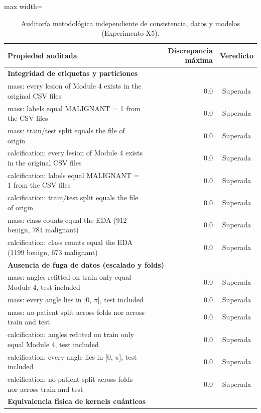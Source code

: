 \begin{table}[H]
\centering
\small
\caption{Auditoría metodológica independiente de consistencia, datos y modelos (Experimento X5).}
\label{tab:anexo_x5_auditoria}
\begin{adjustbox}{max width=\linewidth}
\begin{tabular}{p{11.5cm} r c}
\toprule
Propiedad auditada & Discrepancia máxima & Veredicto \\
\midrule
\multicolumn{3}{l}{\textbf{Integridad de etiquetas y particiones}} \\
\quad mass: every lesion of Module 4 exists in the original CSV files & 0.0 & Superada \\
\quad mass: labels equal MALIGNANT = 1 from the CSV files & 0.0 & Superada \\
\quad mass: train/test split equals the file of origin & 0.0 & Superada \\
\quad calcification: every lesion of Module 4 exists in the original CSV files & 0.0 & Superada \\
\quad calcification: labels equal MALIGNANT = 1 from the CSV files & 0.0 & Superada \\
\quad calcification: train/test split equals the file of origin & 0.0 & Superada \\
\quad mass: class counts equal the EDA (912 benign, 784 malignant) & 0.0 & Superada \\
\quad calcification: class counts equal the EDA (1199 benign, 673 malignant) & 0.0 & Superada \\
\multicolumn{3}{l}{\textbf{Ausencia de fuga de datos (escalado y folds)}} \\
\quad mass: angles refitted on train only equal Module 4, test included & 0.0 & Superada \\
\quad mass: every angle lies in [0, $\pi$], test included & 0.0 & Superada \\
\quad mass: no patient split across folds nor across train and test & 0.0 & Superada \\
\quad calcification: angles refitted on train only equal Module 4, test included & 0.0 & Superada \\
\quad calcification: every angle lies in [0, $\pi$], test included & 0.0 & Superada \\
\quad calcification: no patient split across folds nor across train and test & 0.0 & Superada \\
\multicolumn{3}{l}{\textbf{Equivalencia física de kernels cuánticos}} \\

\end{tabular}
\end{adjustbox}
\end{table}
